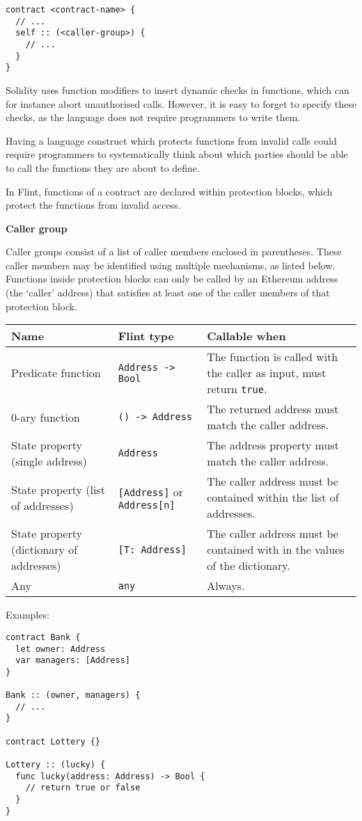 \begin{verbatim}
contract <contract-name> {
  // ...
  self :: (<caller-group>) {
    // ...
  }
}
\end{verbatim}

Solidity uses function modifiers to insert dynamic checks in functions, which can for instance abort unauthorised calls. However, it is easy to forget to specify these checks, as the language does not require programmers to write them.

Having a language construct which protects functions from invalid calls could require programmers to systematically think about which parties should be able to call the functions they are about to define.

In Flint, functions of a contract are declared within protection blocks, which protect the functions from invalid access.

\textbf{Caller group}
\label{sec:appendix-b-caller-group}

Caller groups consist of a list of caller members enclosed in parentheses. These caller members may be identified using multiple mechanisms, as listed below. Functions inside protection blocks can only be called by an Ethereum address (the `caller' address) that satisfies at least one of the caller members of that protection block.

\begin{tabularx}{\textwidth}{llX}
	Name & Flint type & Callable when\\\hline
	Predicate function & \texttt{Address -> Bool} & The function is called with the caller as input, must return \texttt{true}.\\
	0-ary function & \texttt{() -> Address} & The returned address must match the caller address.\\
	State property (single address) & \texttt{Address} & The address property must match the caller address.\\
	State property (list of addresses) & \texttt{[Address]} or \texttt{Address[n]} & The caller address must be contained within the list of addresses.\\
	State property (dictionary of addresses) & \texttt{[T: Address]} & The caller address must be contained with in the values of the dictionary.\\
	Any & \texttt{any} & Always.
\end{tabularx}

Examples:

\begin{verbatim}
contract Bank {
  let owner: Address
  var managers: [Address]
}

Bank :: (owner, managers) {
  // ...
}

contract Lottery {}

Lottery :: (lucky) {
  func lucky(address: Address) -> Bool {
    // return true or false
  }
}
\end{verbatim}

